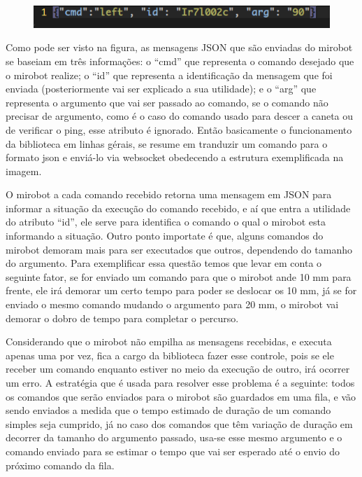 \begin{figure}[H]
\centering
\includegraphics[scale=0.50]{imagens/comandojson.png} 
\label{fig:comandojson}
\end{figure}

Como pode ser visto na figura, as mensagens JSON que são enviadas do mirobot se
baseiam em três informações: o ``cmd'' que representa o comando desejado que o
mirobot realize; o ``id'' que representa a identificação da mensagem que foi
enviada (posteriormente vai ser explicado a sua utilidade); e o ``arg'' que
representa o argumento que vai ser passado ao comando, se o comando não
precisar de argumento, como é o caso do comando usado para descer a caneta ou
de verificar o ping, esse atributo é ignorado. Então basicamente o
funcionamento da biblioteca em linhas gérais, se resume em tranduzir um comando
para o formato json e enviá-lo via websocket obedecendo a estrutura
exemplificada na imagem. 

O mirobot a cada comando recebido retorna uma mensagem em JSON para informar a
situação da execução do comando recebido, e aí que entra a utilidade do
atributo ``id'', ele serve para identifica o comando o qual o mirobot esta
informando a situação. Outro ponto importate é que, alguns comandos do mirobot
demoram mais para ser executados que outros, dependendo do tamanho do
argumento. Para exemplificar essa questão temos que levar em conta o seguinte
fator, se for enviado um comando para que o mirobot ande 10 mm para frente, ele
irá demorar um certo tempo para poder se deslocar os 10 mm, já se for enviado o
mesmo comando mudando o argumento para 20 mm, o mirobot vai demorar o dobro de
tempo para completar o percurso. 

Considerando que o mirobot não empilha as mensagens recebidas, e executa apenas
uma por vez, fica a cargo da biblioteca fazer esse controle, pois se ele
receber um comando enquanto estiver no meio da execução de outro, irá ocorrer
um erro. A estratégia que é usada para resolver esse problema é a seguinte:
todos os comandos que serão enviados para o mirobot são guardados em uma fila,
e vão sendo enviados a medida que o tempo estimado de duração de um comando
simples seja cumprido, já no caso dos comandos que têm variação de duração em
decorrer da tamanho do argumento passado, usa-se esse mesmo argumento e o
comando enviado para se estimar o tempo que vai ser esperado até o envio do
próximo comando da fila.
 
